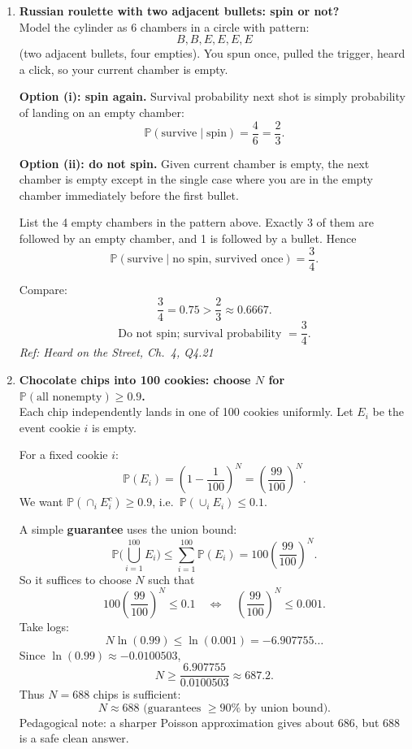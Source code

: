 \documentclass[11pt]{article}
\begin{document}
\begin{enumerate}[label=\textbf{\arabic*.}, resume]

\item \textbf{Russian roulette with two adjacent bullets: spin or not?}\\
Model the cylinder as 6 chambers in a circle with pattern:
\[
B, B, E, E, E, E
\]
(two adjacent bullets, four empties). You spun once, pulled the trigger, heard a click, so your current chamber is empty.

\medskip
\noindent\textbf{Option (i): spin again.} Survival probability next shot is simply probability of landing on an empty chamber:
\[
\mathbb{P}(\text{survive}\mid \text{spin})=\frac{4}{6}=\frac{2}{3}.
\]

\medskip
\noindent\textbf{Option (ii): do not spin.} Given current chamber is empty, the next chamber is empty except in the single case where you are in the empty chamber immediately before the first bullet.

List the 4 empty chambers in the pattern above. Exactly 3 of them are followed by an empty chamber, and 1 is followed by a bullet. Hence
\[
\mathbb{P}(\text{survive}\mid \text{no spin, survived once})=\frac{3}{4}.
\]

\medskip
Compare:
\[
\frac{3}{4}=0.75 > \frac{2}{3}\approx 0.6667.
\]
\[
\boxed{\text{Do not spin; survival probability }=\frac{3}{4}.}
\]
\hfill{\small\textit{Ref: Heard on the Street, Ch.\ 4, Q4.21}}

\item \textbf{Chocolate chips into 100 cookies: choose $N$ for $\mathbb{P}(\text{all nonempty})\ge 0.9$.}\\
Each chip independently lands in one of 100 cookies uniformly. Let $E_i$ be the event cookie $i$ is empty.

For a fixed cookie $i$:
\[
\mathbb{P}(E_i)=\left(1-\frac{1}{100}\right)^N=\left(\frac{99}{100}\right)^N.
\]
We want $\mathbb{P}(\cap_i E_i^c)\ge 0.9$, i.e.\ $\mathbb{P}(\cup_i E_i)\le 0.1$.

A simple \textbf{guarantee} uses the union bound:
\[
\mathbb{P}\Big(\bigcup_{i=1}^{100} E_i\Big)\le \sum_{i=1}^{100}\mathbb{P}(E_i)
=100\left(\frac{99}{100}\right)^N.
\]
So it suffices to choose $N$ such that
\[
100\left(\frac{99}{100}\right)^N \le 0.1
\quad\Longleftrightarrow\quad
\left(\frac{99}{100}\right)^N \le 0.001.
\]
Take logs:
\[
N\ln(0.99)\le \ln(0.001)=-6.907755\ldots
\]
Since $\ln(0.99)\approx -0.0100503$,
\[
N \ge \frac{6.907755}{0.0100503}\approx 687.2.
\]
Thus $N=688$ chips is sufficient:
\[
\boxed{N\approx 688 \text{ (guarantees } \ge 90\%\text{ by union bound).}}
\]
Pedagogical note: a sharper Poisson approximation gives about $686$, but $688$ is a safe clean answer.


\end{enumerate}
\end{document}
